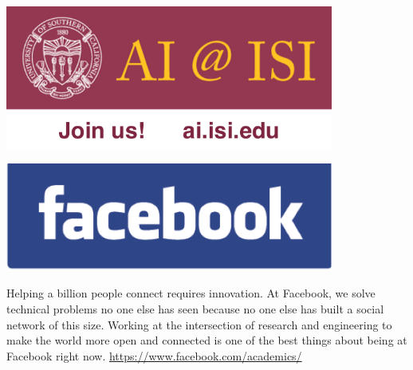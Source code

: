 \thispagestyle{empty}
\includegraphics[width=4.25in]{content/ads/silver/ISI-Ad-silver.pdf}

\vfill

\includegraphics[width=4.25in]{content/ads/bronze/facebook.png}

Helping a billion people connect requires innovation. At Facebook, we
solve technical problems no one else has seen because no one else has
built a social network of this size. Working at the intersection of
research and engineering to make the world more open and connected is
one of the best things about being at Facebook right
now. \url{https://www.facebook.com/academics/}


